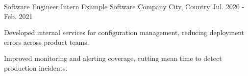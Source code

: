 \begin{cventries}
  \cventry
    {Software Engineer Intern} %
    {Example Software Company} %
    {City, Country} %
    {Jul. 2020 - Feb. 2021} %
    {
      \begin{cvitems} %
        \item {Developed internal services for configuration management, reducing deployment errors across product teams.}
        \item {Improved monitoring and alerting coverage, cutting mean time to detect production incidents.}
      \end{cvitems}
    }

\end{cventries}
